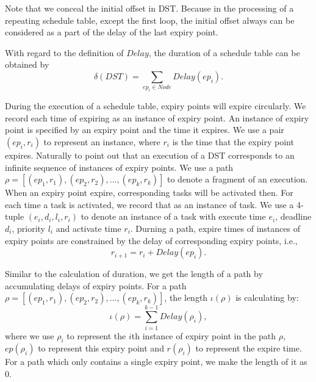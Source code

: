 \documentclass[sigconf]{acmart}
\begin{document}
Note that we conceal the initial offset in DST. Because in the processing of a repeating schedule table, except the first loop, the initial offset always can be considered as a part of the delay of the last expiry point.

With regard to the definition of $Delay$, the duration of a schedule table can be obtained by 
\[\delta(DST)=\sum\limits_{ep_i\in Node}Delay(ep_i).\]

During the execution of a schedule table, expiry points will expire circularly. We record each time of expiring as an instance of expiry point. An instance of expiry point is specified by an expiry point and the time it expires. We use a pair $(ep_i,r_i)$ to represent an instance, where $r_i$ is the time that the expiry point expires. 
Naturally to point out that an execution of a DST corresponds to an infinite sequence of instances of expiry points. 
We use a path $\rho=[(ep_1,r_1),(ep_2,r_2),\dots,(ep_k,r_k)]$ to denote a fragment of an execution. When an expiry point expire, corresponding tasks will be activated then. For each time a task is activated, we record that as an instance of task. We use a 4-tuple $(e_i,d_i,l_i,r_i)$ to denote an instance of a task with execute time $e_i$, deadline $d_i$, priority $l_i$ and activate time $r_i$. Durning a path, expire times of instances of expiry points are constrained by the delay of corresponding expiry points, i.e., 
\[r_{i+1}=r_i+Delay(ep_i).\]

Similar to the calculation of duration, we get the length of a path by accumulating delays of expiry points. For a path $\rho=[(ep_1,r_1),(ep_2,r_2),\dots,(ep_k,r_k)]$, the length $\iota(\rho)$ is calculating by: 
\[\iota(\rho)=\sum_{i=1}^{k-1} Delay(\rho_i),\]
where we use $\rho_i$ to represent the $i$th instance of expiry point in the path $\rho$, $ep(\rho_i)$ to represent this expiry point and $r(\rho_i)$ to represent the expire time. For a path which only contains a single expiry point, we make the length of it as 0. %
\end{document}
